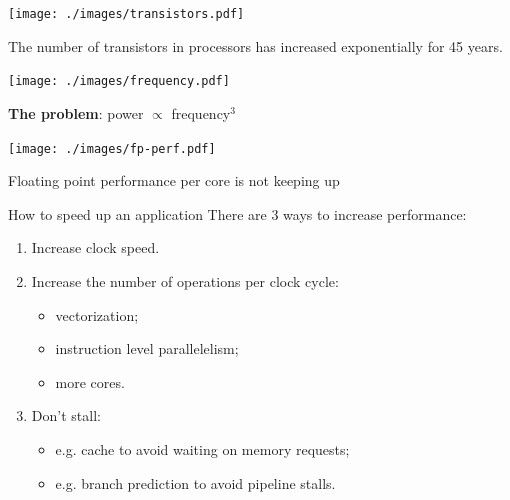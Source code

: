 \documentclass[aspectratio=43]{beamer}
\begin{document}
\begin{frame}[fragile]{}
    \begin{center}
        \texttt{[image: ./images/transistors.pdf]}

        The number of transistors in processors has increased exponentially for 45 years.
    \end{center}
\end{frame}

\begin{frame}[fragile]{}
    \begin{center}
        \texttt{[image: ./images/frequency.pdf]}

        \textbf{The problem}: power $\propto$ frequency$^3$
    \end{center}
\end{frame}

\begin{frame}[fragile]{}
    \begin{center}
        \texttt{[image: ./images/fp-perf.pdf]}

        Floating point performance per core is not keeping up
    \end{center}
\end{frame}

\begin{frame}[fragile]{How to speed up an application}
    There are 3 ways to increase performance:
    \begin{enumerate}
        \item Increase clock speed.
        \item Increase the number of operations per clock cycle:
        \begin{itemize}
            \item vectorization;
            \item instruction level parallelelism;
            \item more cores.
        \end{itemize}
        \item Don't stall:
        \begin{itemize}
            \item e.g. cache to avoid waiting on memory requests;
            \item e.g. branch prediction to avoid pipeline stalls.
        \end{itemize}
    \end{enumerate}
\end{frame}
\end{document}
